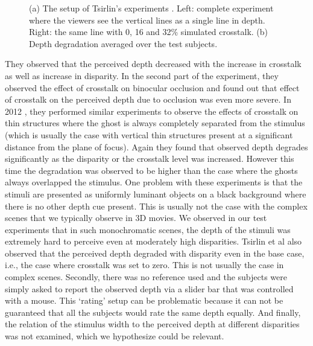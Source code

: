 \begin{figure}[htbp]
\begin{subfigure}[b]{0.5\textwidth}
        \caption{}\label{fig:tsirlin_res}
    \end{subfigure}
    \caption{(a) The setup of Tsirlin's experiments \cite{tsirlin2012effect} \cite{tsirlin2012crosstalk}. Left: complete experiment where the viewers see the vertical lines as a single line in depth. Right: the same line with 0, 16 and 32\% simulated crosstalk. (b) Depth degradation averaged over the test subjects.\label{fig:tsirlin}}
\end{figure}
They observed that the perceived depth decreased with the increase in crosstalk as well as increase in disparity. In the second part of the experiment, they observed the effect of crosstalk on binocular occlusion and found out that effect of crosstalk on the perceived depth due to occlusion was even more severe. In 2012 \cite{tsirlin2012effect}, they performed similar experiments to observe the effects of crosstalk on thin structures where the ghost is always completely separated from the stimulus (which is usually the case with vertical thin structures present at a significant distance from the plane of focus). Again they found that observed depth degrades significantly as the disparity or the crosstalk level was increased. However this time the degradation was observed to be higher than the case where the ghosts always overlapped the stimulus. One problem with these experiments is that the stimuli are presented as uniformly luminant objects on a black background where there is no other depth cue present. This is usually not the case with the complex scenes that we typically observe in 3D movies. We observed in our test experiments that in such monochromatic scenes, the depth of the stimuli was extremely hard to perceive even at moderately high disparities. Tsirlin et al also observed that the perceived depth degraded with disparity even in the base case, i.e., the case where crosstalk was set to zero. This is not usually the case in complex scenes. Secondly, there was no reference used and the subjects were simply asked to report the observed depth via a slider bar that was controlled with a mouse. This `rating' setup can be problematic because it can not be guaranteed that all the subjects would rate the same depth equally. And finally, the relation of the stimulus width to the perceived depth at different disparities was not examined, which we hypothesize could be relevant.

